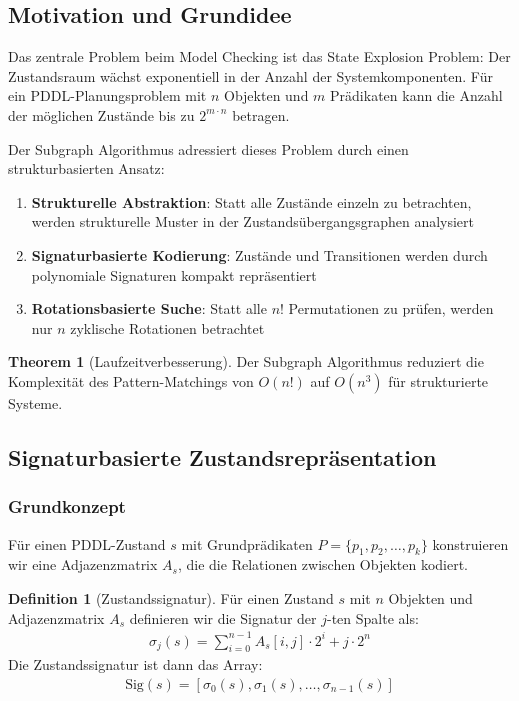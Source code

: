 ﻿\documentclass[a4paper,12pt]{article}
\theoremstyle{definition}
\newtheorem{definition}{Definition}[section]
\newtheorem{theorem}{Theorem}[section]
\begin{document}
\subsection{Motivation und Grundidee}

Das zentrale Problem beim Model Checking ist das State Explosion Problem: Der Zustandsraum wächst exponentiell in der Anzahl der Systemkomponenten. Für ein PDDL-Planungsproblem mit $n$ Objekten und $m$ Prädikaten kann die Anzahl der möglichen Zustände bis zu $2^{m \cdot n}$ betragen.

Der Subgraph Algorithmus adressiert dieses Problem durch einen strukturbasierten Ansatz:
\begin{enumerate}
	\item \textbf{Strukturelle Abstraktion}: Statt alle Zustände einzeln zu betrachten, werden strukturelle Muster in der Zustandsübergangsgraphen analysiert
	\item \textbf{Signaturbasierte Kodierung}: Zustände und Transitionen werden durch polynomiale Signaturen kompakt repräsentiert
	\item \textbf{Rotationsbasierte Suche}: Statt alle $n!$ Permutationen zu prüfen, werden nur $n$ zyklische Rotationen betrachtet
\end{enumerate}

\begin{theorem}[Laufzeitverbesserung]
	Der Subgraph Algorithmus reduziert die Komplexität des Pattern-Matchings von $O(n!)$ auf $O(n^3)$ für strukturierte Systeme.
\end{theorem}

\subsection{Signaturbasierte Zustandsrepräsentation}

\subsubsection{Grundkonzept}

Für einen PDDL-Zustand $s$ mit Grundprädikaten $P = \{p_1, p_2, \ldots, p_k\}$ konstruieren wir eine Adjazenzmatrix $A_s$, die die Relationen zwischen Objekten kodiert.

\begin{definition}[Zustandssignatur]
	Für einen Zustand $s$ mit $n$ Objekten und Adjazenzmatrix $A_s$ definieren wir die Signatur der $j$-ten Spalte als:
	\begin{align}
	\sigma_j(s) = \sum_{i=0}^{n-1} A_s[i,j] \cdot 2^i + j \cdot 2^n
	\end{align}
	Die Zustandssignatur ist dann das Array:
	\begin{align}
	\text{Sig}(s) = [\sigma_0(s), \sigma_1(s), \ldots, \sigma_{n-1}(s)]
	\end{align}
\end{definition}
\end{document}
